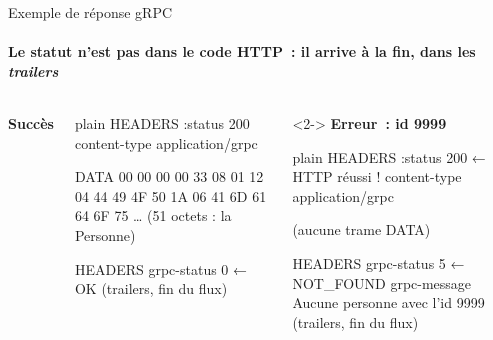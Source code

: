 \documentclass[aspectratio=169,11pt]{beamer}
\begin{document}
\begin{frame}[fragile]{Exemple de réponse gRPC}
  \framesubtitle{Le statut n'est pas dans le code HTTP~: il arrive à la fin, dans les \emph{trailers}}
  \begin{columns}[T,onlytextwidth]
    {\small\bfseries\color{Vert}\faCheckCircle\enspace Succès}
\begin{codetiny}{plain}
HEADERS  :status 200
         content-type application/grpc

DATA     00  00 00 00 33  08 01 12 04 44 49 4F 50
         1A 06 41 6D 61 64 6F 75 …
         (51 octets : la Personne)

HEADERS  grpc-status   0                ← OK
(trailers, fin du flux)
\end{codetiny}
    \begin{uncoverenv}<2->
    {\small\bfseries\color{Rouge}\faTimesCircle\enspace Erreur~: id 9999}
\begin{codetiny}{plain}
HEADERS  :status 200          ← HTTP réussi !
         content-type application/grpc

(aucune trame DATA)

HEADERS  grpc-status   5      ← NOT_FOUND
         grpc-message  Aucune personne avec l'id 9999
(trailers, fin du flux)
\end{codetiny}
    \end{uncoverenv}
  \end{columns}
  \vspace{0.1cm}
\end{frame}
\end{document}
